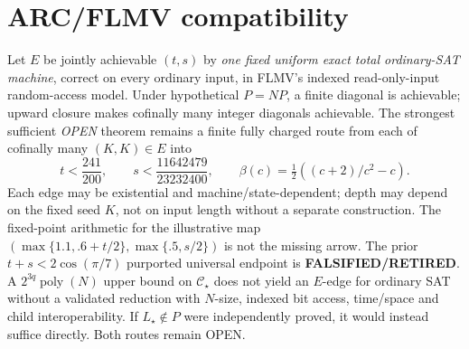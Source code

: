 \documentclass[10pt]{article}
\begin{document}
\section{ARC/FLMV compatibility}
Let \(E\) be jointly achievable \((t,s)\) by \emph{one fixed uniform exact total ordinary-SAT machine}, correct on every ordinary input, in FLMV's indexed read-only-input random-access model. Under hypothetical \(P=NP\), a finite diagonal is achievable; upward closure makes cofinally many integer diagonals achievable. The strongest sufficient \emph{OPEN} theorem remains a finite fully charged route from each of cofinally many \((K,K)\in E\) into
\[
t<\frac{241}{200},\qquad
s<\frac{11642479}{23232400},\qquad
\beta(c)=\tfrac12((c+2)/c^2-c).
\]
Each edge may be existential and machine/state-dependent; depth may depend on the fixed seed \(K\), not on input length without a separate construction. The fixed-point arithmetic for the illustrative map \((\max\{1.1,.6+t/2\},\max\{.5,s/2\})\) is not the missing arrow. The prior \(t+s<2\cos(\pi/7)\) purported universal endpoint is \textbf{FALSIFIED/RETIRED}. A \(2^{3q}\operatorname{poly}(N)\) upper bound on \(\mathcal C_\star\) does not yield an \(E\)-edge for ordinary SAT without a validated reduction with \(N\)-size, indexed bit access, time/space and child interoperability. If \(L_\star\notin P\) were independently proved, it would instead suffice directly. Both routes remain OPEN.
\end{document}

